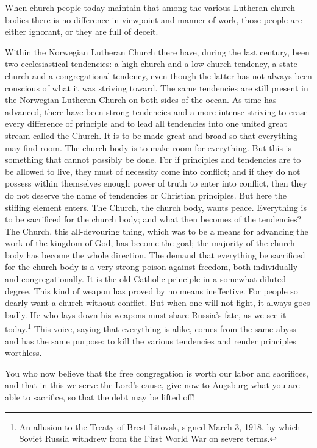 When church people today maintain that among the various Lutheran church bodies there is no difference in viewpoint and manner of work, those people are either ignorant, or they are full of deceit.

Within the Norwegian Lutheran Church there have, during the last century, been two ecclesiastical tendencies: a high-church and a low-church tendency, a state-church and a congregational tendency, even though the latter has not always been conscious of what it was striving toward. The same tendencies are still present in the Norwegian Lutheran Church on both sides of the ocean. As time has advanced, there have been strong tendencies and a more intense striving to erase every difference of principle and to lead all tendencies into one united great stream called the Church. It is to be made great and broad so that everything may find room. The church body is to make room for everything. But this is something that cannot possibly be done. For if principles and tendencies are to be allowed to live, they must of necessity come into conflict; and if they do not possess within themselves enough power of truth to enter into conflict, then they do not deserve the name of tendencies or Christian principles. But here the stifling element enters. The Church, the church body, wants peace. Everything is to be sacrificed for the church body; and what then becomes of the tendencies? The Church, this all-devouring thing, which was to be a means for advancing the work of the kingdom of God, has become the goal; the majority of the church body has become the whole direction. The demand that everything be sacrificed for the church body is a very strong poison against freedom, both individually and congregationally. It is the old Catholic principle in a somewhat diluted degree. This kind of weapon has proved by no means ineffective. For people so dearly want a church without conflict. But when one will not fight, it always goes badly. He who lays down his weapons must share Russia’s fate, as we see it today.\footnote{An allusion to the Treaty of Brest-Litovsk, signed March 3, 1918, by which Soviet Russia withdrew from the First World War on severe terms.} This voice, saying that everything is alike, comes from the same abyss and has the same purpose: to kill the various tendencies and render principles worthless.

You who now believe that the free congregation is worth our labor and sacrifices, and that in this we serve the Lord’s cause, give now to Augsburg what you are able to sacrifice, so that the debt may be lifted off!

